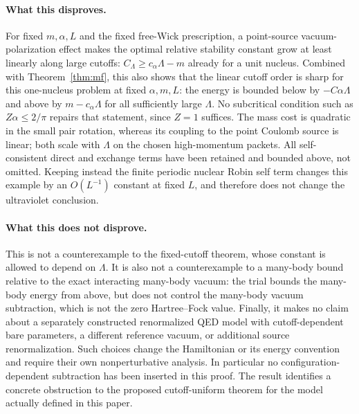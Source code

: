 \paragraph{What this disproves.}
For fixed $m,\alpha,L$ and the fixed free-Wick prescription, a point-source
vacuum-polarization effect makes the optimal relative stability constant
grow at least linearly along large cutoffs:
$C_\Lambda\ge c_\alpha\Lambda-m$ already for a unit nucleus.
Combined with Theorem~\ref{thm:mf}, this also shows that the linear
cutoff order is sharp for this one-nucleus problem at fixed $\alpha,m,L$:
the energy is bounded below by $-C\alpha\Lambda$ and above by
$m-c_\alpha\Lambda$ for all sufficiently large $\Lambda$.
No subcritical condition such as $Z\alpha\le2/\pi$ repairs that statement,
since $Z=1$ suffices.  The mass cost is quadratic in the small pair rotation,
whereas its coupling to the point Coulomb source is linear; both scale with
$\Lambda$ on the chosen high-momentum packets.  All self-consistent direct
and exchange terms have been retained and bounded above, not omitted.
Keeping instead the finite periodic nuclear Robin self term changes this
example by an $O(L^{-1})$ constant at fixed $L$, and therefore does not change
the ultraviolet conclusion.

\paragraph{What this does not disprove.}
This is not a counterexample to the fixed-cutoff theorem, whose constant is
allowed to depend on $\Lambda$.  It is also not a counterexample to a
many-body bound relative to the exact interacting many-body vacuum: the
trial bounds the many-body energy from above, but does not control the
many-body vacuum subtraction, which is not the zero Hartree--Fock value.
Finally, it makes no claim about a separately constructed renormalized QED
model with cutoff-dependent bare parameters, a different reference vacuum,
or additional source renormalization.  Such choices change the Hamiltonian
or its energy convention and require their own nonperturbative analysis.
In particular no configuration-dependent subtraction has been inserted in
this proof.  The result identifies a concrete obstruction to the proposed
cutoff-uniform theorem for the model actually defined in this paper.
